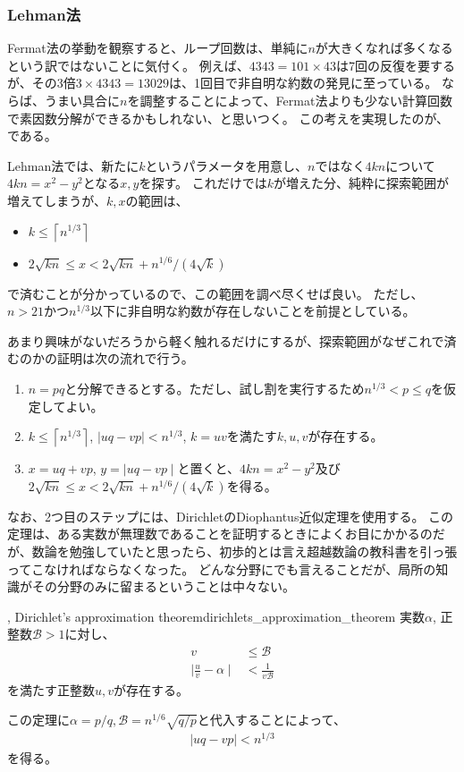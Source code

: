 \subsubsection{Lehman法}
Fermat法の挙動を観察すると、ループ回数は、単純に$n$が大きくなれば多くなるという訳ではないことに気付く。
例えば、$4343=101\times43$は7回の反復を要するが、その3倍$3\times4343=13029$は、1回目で非自明な約数の発見に至っている。
ならば、うまい具合に$n$を調整することによって、Fermat法よりも少ない計算回数で素因数分解ができるかもしれない、と思いつく。
この考えを実現したのが、である。

Lehman法では、新たに$k$というパラメータを用意し、$n$ではなく$4kn$について$4kn=x^2-y^2$となる$x,y$を探す。
これだけでは$k$が増えた分、純粋に探索範囲が増えてしまうが、$k,x$の範囲は、
\begin{itemize}
\item $k \le \left \lceil n^{1/3}\right \rceil$
\item $2\sqrt{kn}\le x < 2\sqrt{kn}+n^{1/6}/(4\sqrt{k})$
\end{itemize}
で済むことが分かっているので、この範囲を調べ尽くせば良い。
ただし、$n>21$かつ$n^{1/3}$以下に非自明な約数が存在しないことを前提としている。


あまり興味がないだろうから軽く触れるだけにするが、探索範囲がなぜこれで済むのかの証明は次の流れで行う。
\begin{enumerate}
 \item $n=pq$と分解できるとする。ただし、試し割を実行するため$n^{1/3}<p\le q$を仮定してよい。
 \item $k \le \left \lceil n^{1/3}\right \rceil$, $\mid uq - vp \mid < n^{1/3}$, $k = uv$を満たす$k, u, v$が存在する。
 \item $x = uq + vp$, $y = \mid uq - vp \mid$と置くと、$4kn=x^2-y^2$及び$2\sqrt{kn}\le x < 2\sqrt{kn}+n^{1/6}/(4\sqrt{k})$を得る。
\end{enumerate}

なお、2つ目のステップには、DirichletのDiophantus近似定理を使用する。
この定理は、ある実数が無理数であることを証明するときによくお目にかかるのだが、数論を勉強していたと思ったら、初歩的とは言え超越数論の教科書を引っ張ってこなければならなくなった。
どんな分野にでも言えることだが、局所の知識がその分野のみに留まるということは中々ない。

\begin{Theo}{, Dirichlet's approximation theorem}{dirichlets_approximation_theorem}
実数$\alpha$, 正整数$\mathcal{B}>1$に対し、
\begin{align*}
v &\le \mathcal{B}\\
\mid \frac{u}{v} - \alpha \mid &< \frac{1}{v\mathcal{B}}
\end{align*}
を満たす正整数$u,v$が存在する。
\end{Theo}

この定理に$\alpha=p/q,\mathcal{B}=n^{1/6}\sqrt{q/p}$と代入することによって、
\begin{align*}
\mid uq - vp \mid < n^{1/3}
\end{align*}
を得る。
